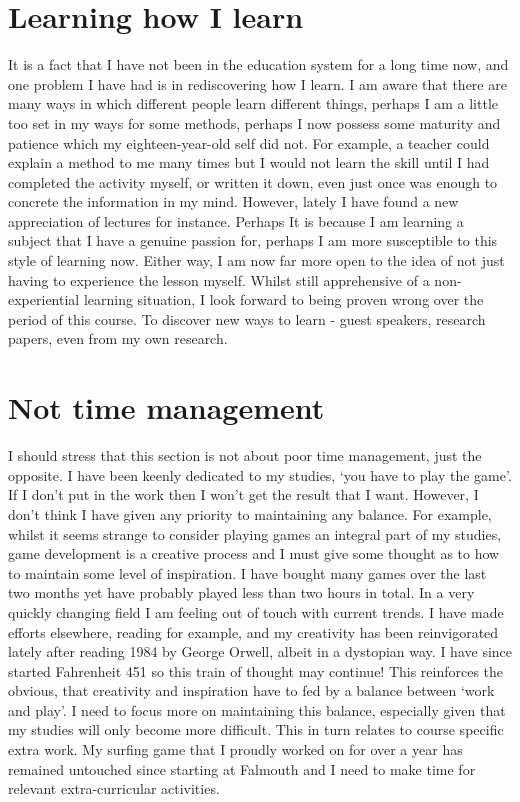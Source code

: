 \documentclass{scrartcl}
\begin{document}
\section{Learning how I learn}

It is a fact that I have not been in the education system for a long time now, and one problem I have had is in rediscovering how I learn. I am aware that there are many ways in which different people learn different things, perhaps I am a little too set in my ways for some methods, perhaps I now possess some maturity and patience which my eighteen-year-old self did not. For example, a teacher could explain a method to me many times but I would not learn the skill until I had completed the activity myself, or written it down, even just once was enough to concrete the information in my mind. However, lately I have found a new appreciation of lectures for instance. Perhaps It is because I am learning a subject that I have a genuine passion for, perhaps I am more susceptible to this style of learning now. Either way, I am now far more open to the idea of not just having to experience the lesson myself. Whilst still apprehensive of a non-experiential learning situation, I look forward to being proven wrong over the period of this course. To discover new ways to learn - guest speakers, research papers, even from my own research.

\section{Not time management}

I should stress that this section is not about poor time management, just the opposite. I have been keenly dedicated to my studies, `you have to play the game'. If I don't put in the work then I won't get the result that I want. However, I don't think I have given any priority to maintaining any balance. For example, whilst it seems strange to consider playing games an integral part of my studies, game development is a creative process and I must give some thought as to how to maintain some level of inspiration. I have bought many games over the last two months yet have probably played less than two hours in total. In a very quickly changing field I am feeling out of touch with current trends. I have made efforts elsewhere, reading for example, and my creativity has been reinvigorated lately after reading 1984 by George Orwell, albeit in a dystopian way. I have since started Fahrenheit 451 so this train of thought may continue! This reinforces the obvious, that creativity and inspiration have to fed by a balance between `work and play'. I need to focus more on maintaining this balance, especially given that my studies will only become more difficult. This in turn relates to course specific extra work. My surfing game that I proudly worked on for over a year has remained untouched since starting at Falmouth and I need to make time for relevant extra-curricular activities.
\end{document}
